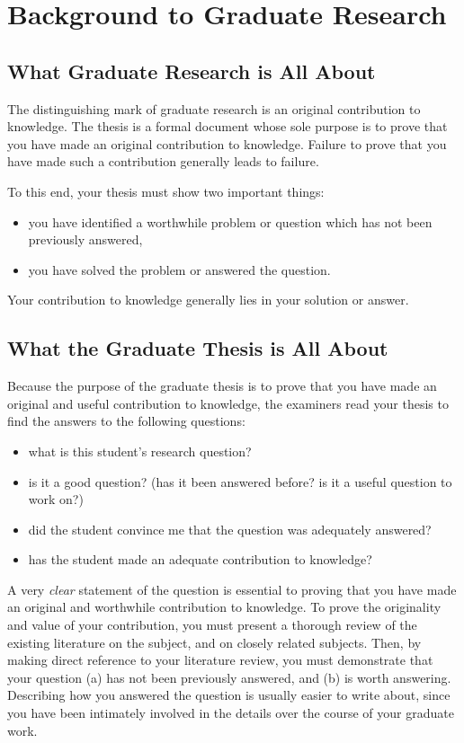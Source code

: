 %
%
%
%
%
\chapter{Background to Graduate Research} \label{chap:background}


\section{What Graduate Research is All About}
The distinguishing mark of graduate research is an original contribution to knowledge. The thesis is a formal document whose sole purpose is to prove that you have made an original contribution to knowledge. Failure to prove that you have made such a contribution generally leads to failure.

To this end, your thesis must show two important things:
\begin{itemize}
  \item you have identified a worthwhile problem or question which has not been previously answered,
  \item you have solved the problem or answered the question.
\end{itemize}
    
Your contribution to knowledge generally lies in your solution or answer. 

\section{What the Graduate Thesis is All About}
Because the purpose of the graduate thesis is to prove that you have made an original and useful contribution to knowledge, the examiners read your thesis to find the answers to the following questions:
\begin{itemize}
  \item what is this student's research question?
  \item is it a good question? (has it been answered before? is it a useful question to work on?)
  \item did the student convince me that the question was adequately answered?
  \item has the student made an adequate contribution to knowledge?
\end{itemize}
    
A very \emph{clear} statement of the question is essential to proving that you have made an original and worthwhile contribution to knowledge. To prove the originality and value of your contribution, you must present a thorough review of the existing literature on the subject, and on closely related subjects. Then, by making direct reference to your literature review, you must demonstrate that your question (a) has not been previously answered, and (b) is worth answering. Describing how you answered the question is usually easier to write about, since you have been intimately involved in the details over the course of your graduate work.

